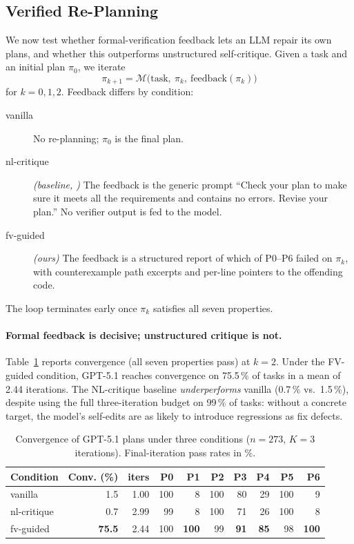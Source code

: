 \subsection{Verified Re-Planning}
\label{sec:replan}

We now test whether formal-verification feedback lets an LLM repair its own
plans, and whether this outperforms unstructured self-critique.  Given a task
and an initial plan $\pi_0$, we iterate
\[
  \pi_{k+1} = \mathcal{M}\bigl(\text{task},\ \pi_k,\ \text{feedback}(\pi_k)\bigr)
\]
for $k{=}0,1,2$.  Feedback differs by condition:
\begin{description}
\item[vanilla] No re-planning; $\pi_0$ is the final plan.
\item[nl-critique] \textit{(baseline, \citealp{wang2023plan})}  The
  feedback is the generic prompt ``Check your plan to make sure it meets
  all the requirements and contains no errors. Revise your plan.''  No
  verifier output is fed to the model.
\item[fv-guided] \textit{(ours)} The feedback is a structured report of
  which of P0–P6 failed on $\pi_k$, with counterexample path excerpts and
  per-line pointers to the offending code.
\end{description}
The loop terminates early once $\pi_k$ satisfies all seven properties.

\paragraph{Formal feedback is decisive; unstructured critique is not.}
Table~\ref{tab:replan-conditions} reports convergence (all seven properties
pass) at $k{=}2$.  Under the FV-guided condition, GPT-5.1 reaches convergence
on 75.5\,\% of tasks in a mean of 2.44 iterations.  The NL-critique baseline
\emph{underperforms} vanilla (0.7\,\% vs.\ 1.5\,\%), despite using the full
three-iteration budget on 99\,\% of tasks: without a concrete target, the
model's self-edits are as likely to introduce regressions as fix defects.

\begin{table}[h]
\centering
\caption{Convergence of GPT-5.1 plans under three conditions ($n{=}273$,
$K{=}3$ iterations). Final-iteration pass rates in \%.}
\label{tab:replan-conditions}
\small
\begin{tabular}{lrrrrrrrrr}
\toprule
Condition & Conv. (\%) & iters & P0 & P1 & P2 & P3 & P4 & P5 & P6 \\
\midrule
vanilla       &  1.5 & 1.00 & 100 & \phantom{0}8  & 100 & 80 & 29 & 100 & \phantom{0}9 \\
nl-critique   &  0.7 & 2.99 &  99 & \phantom{0}8  & 100 & 71 & 26 & 100 & \phantom{0}8 \\
fv-guided     & \textbf{75.5} & 2.44 & 100 & \textbf{100} & 99  & \textbf{91} & \textbf{85} & 98  & \textbf{100} \\
\bottomrule
\end{tabular}
\end{table}

